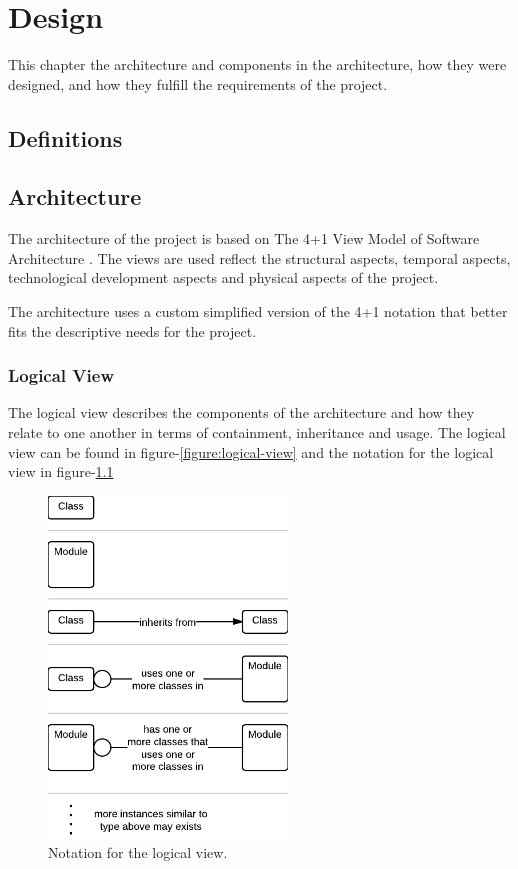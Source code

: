 
\chapter{Design}

\minitoc
This chapter the architecture and components in the architecture, how they were designed, and how they fulfill the requirements of the project.


\clearpage


\section{Definitions}


\section{Architecture}
The architecture of the project is based on The 4+1 View
Model of Software Architecture \cite{Kruchten}. The views are used reflect the structural aspects, temporal aspects, technological development aspects and physical aspects of the project.

The architecture uses a custom simplified version of the 4+1 notation that better fits the descriptive needs for the project.


\subsection{Logical View}
The logical view describes the components of the architecture and how they relate to one another in terms of containment, inheritance and usage. The logical view can be found in figure-\ref{figure:logical-view} and the notation for the logical view in figure-\ref{figure:logical-view-notation}

\begin{figure}[H]
\centerline{\includegraphics[width=2.5in]{image/architecture-logical-view-notation.png}}
\caption{Notation for the logical view.}
\label{figure:logical-view-notation}
\end{figure}

